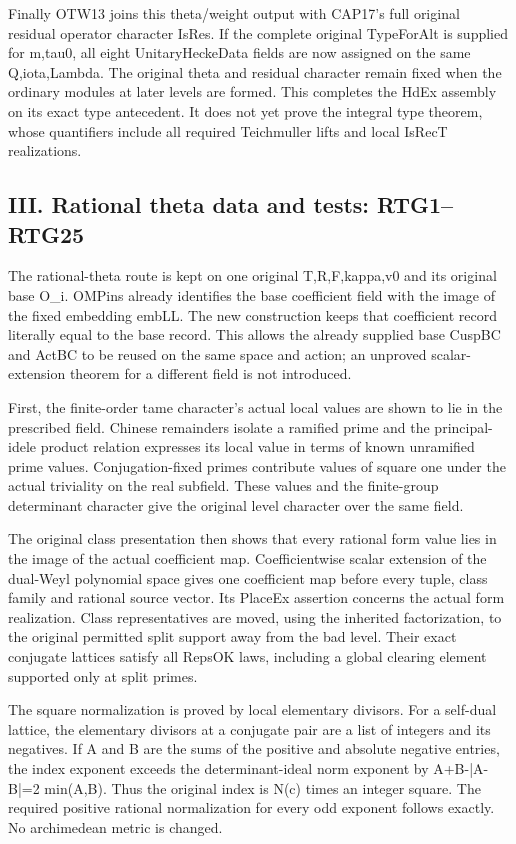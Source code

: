 Finally OTW13 joins this theta/\allowbreak{}weight output with CAP17's full original residual operator character IsRes. If the complete original TypeForAlt is supplied for m,tau0, all eight UnitaryHeckeData fields are now assigned on the same Q,iota,Lambda. The original theta and residual character remain fixed when the ordinary modules at later levels are formed. This completes the HdEx assembly on its exact type antecedent. It does not yet prove the integral type theorem, whose quantifiers include all required Teichmuller lifts and local IsRecT realizations.

\subsection{III. Rational theta data and tests: RTG1–RTG25}

The rational-theta route is kept on one original T,R,F,kappa,v0 and its original base O\_\allowbreak{}i. OMPins already identifies the base coefficient field with the image of the fixed embedding embLL. The new construction keeps that coefficient record literally equal to the base record. This allows the already supplied base CuspBC and ActBC to be reused on the same space and action; an unproved scalar-extension theorem for a different field is not introduced.

First, the finite-order tame character's actual local values are shown to lie in the prescribed field. Chinese remainders isolate a ramified prime and the principal-idele product relation expresses its local value in terms of known unramified prime values. Conjugation-fixed primes contribute values of square one under the actual triviality on the real subfield. These values and the finite-group determinant character give the original level character over the same field.

The original class presentation then shows that every rational form value lies in the image of the actual coefficient map. Coefficientwise scalar extension of the dual-Weyl polynomial space gives one coefficient map before every tuple, class family and rational source vector. Its PlaceEx assertion concerns the actual form realization. Class representatives are moved, using the inherited factorization, to the original permitted split support away from the bad level. Their exact conjugate lattices satisfy all RepsOK laws, including a global clearing element supported only at split primes.

The square normalization is proved by local elementary divisors. For a self-dual lattice, the elementary divisors at a conjugate pair are a list of integers and its negatives. If A and B are the sums of the positive and absolute negative entries, the index exponent exceeds the determinant-ideal norm exponent by A+B-|A-B|=2 min(A,B). Thus the original index is N(c) times an integer square. The required positive rational normalization for every odd exponent follows exactly. No archimedean metric is changed.

